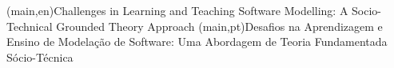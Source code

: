 
%




\nttitle(main,en){Challenges in Learning and Teaching Software Modelling: A Socio-Technical Grounded Theory Approach}%
\nttitle(main,pt){Desafios na Aprendizagem e Ensino de Modelação de Software: Uma Abordagem de Teoria Fundamentada Sócio-Técnica}%









